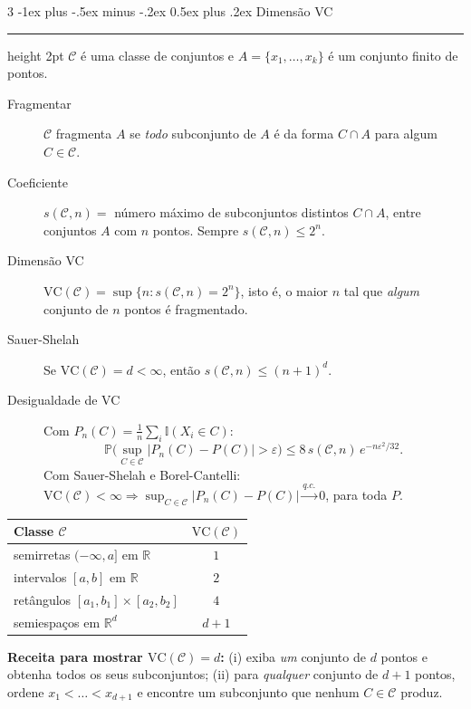 \documentclass[10pt,landscape]{article}
\makeatletter
\renewcommand{\P}{\mathbb{P}}
\newcommand{\I}{\mathbb{I}}
\newcommand{\R}{\mathbb{R}}
\newcommand{\VC}{\textrm{VC}}
\newcommand{\qc}{\xrightarrow{q.c.}}
\renewcommand{\section}{\@startsection{section}{1}{0mm}%
                                {-1ex plus -.5ex minus -.2ex}%
                                {0.5ex plus .2ex}%
                                {\normalfont\small\bfseries}}
\newcommand{\secrule}{\smallskip \hrule height 2pt \smallskip}
\makeatother
\begin{document}
\begin{multicols}{3}
\section{Dimensão VC}\secrule
$\mathcal C$ é uma classe de conjuntos e $A=\{x_1,\dots,x_k\}$ é um conjunto finito de pontos.
\begin{description}
  \item[Fragmentar] $\mathcal C$ fragmenta $A$ se \emph{todo} subconjunto de $A$ é da forma $C\cap A$ para algum $C\in\mathcal C$.
  \item[Coeficiente] $s(\mathcal C,n)=$ número máximo de subconjuntos distintos $C\cap A$, entre conjuntos $A$ com $n$ pontos. Sempre $s(\mathcal C,n)\le2^n$.
  \item[Dimensão VC] $\VC(\mathcal C)=\sup\{n:s(\mathcal C,n)=2^n\}$, isto é, o maior $n$ tal que \emph{algum} conjunto de $n$ pontos é fragmentado.
  \item[Sauer-Shelah] Se $\VC(\mathcal C)=d<\infty$, então $s(\mathcal C,n)\le(n+1)^d$.
  \item[Desigualdade de VC] Com $P_n(C)=\frac1n\sum_i\I(X_i\in C)$:
  \[\P\Big(\sup_{C\in\mathcal C}|P_n(C)-P(C)|>\varepsilon\Big)\le8\,s(\mathcal C,n)\,e^{-n\varepsilon^2/32}.\]
  Com Sauer-Shelah e Borel-Cantelli: $\VC(\mathcal C)<\infty\Rightarrow\sup_{C\in\mathcal C}|P_n(C)-P(C)|\qc0$, para toda $P$.
\end{description}
\begin{center}
\begin{tabular}{lc}
\toprule
Classe $\mathcal C$ & $\VC(\mathcal C)$ \\
\midrule
semirretas $(-\infty,a]$ em $\R$ & $1$ \\
intervalos $[a,b]$ em $\R$ & $2$ \\
retângulos $[a_1,b_1]\times[a_2,b_2]$ & $4$ \\
semiespaços em $\R^d$ & $d+1$ \\
\bottomrule
\end{tabular}
\end{center}
\textbf{Receita para mostrar $\VC(\mathcal C)=d$:} (i) exiba \emph{um} conjunto de $d$ pontos e obtenha todos os seus subconjuntos; (ii) para \emph{qualquer} conjunto de $d+1$ pontos, ordene $x_1<\dots<x_{d+1}$ e encontre um subconjunto que nenhum $C\in\mathcal C$ produz.


\end{multicols}
\end{document}
